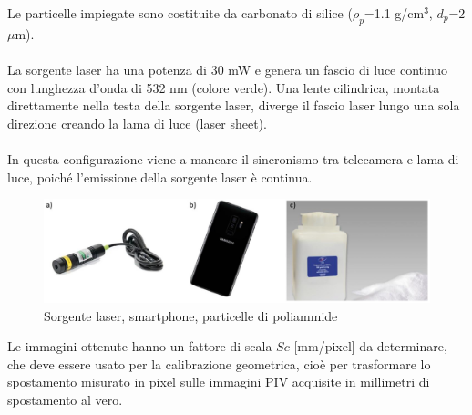 \noindent Le particelle impiegate sono costituite da carbonato di silice ($\rho_p$=1.1 g/cm$^3$, $d_p$=2$\mu$m).\\\\
La sorgente laser ha una potenza di 30 mW e genera un fascio di luce continuo con lunghezza d'onda di 532 nm (colore verde). Una lente cilindrica, montata direttamente nella testa della sorgente laser, diverge il fascio laser lungo una sola direzione creando la lama di luce (laser sheet).\\\\
In questa configurazione viene a mancare il sincronismo tra telecamera e lama di luce, poiché l'emissione della sorgente laser è continua.
\begin{figure}[H]
    \centering
    \includegraphics[width=.7\textwidth]{images/11/catenastrumenti.png}
    \caption{Sorgente laser, smartphone, particelle di poliammide}
\end{figure}

\noindent Le immagini ottenute hanno un fattore di scala $Sc$ [mm/pixel] da determinare, che deve essere usato per la calibrazione geometrica, cioè per trasformare lo spostamento misurato in pixel sulle immagini PIV acquisite in millimetri di spostamento al vero.


